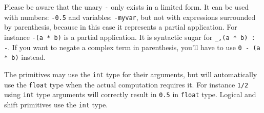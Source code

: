 Please be aware that the unary \lstinline|-| only exists in a limited form. It can be used with numbers: \lstinline|-0.5| and variables: \lstinline|-myvar|, but not with expressions surrounded by parenthesis, because in this case it represents a partial application.  For instance   \lstinline|-(a * b)| is a partial application. It is syntactic sugar for \lstinline|_,(a * b) : -|. If you want to negate a complex term in parenthesis, you'll have to use \lstinline|0 - (a * b)| instead.

The primitives may use the \texttt{int} type for their arguments, but will automatically use the \texttt{float} type when the actual computation requires it. For instance \lstinline|1/2| using \texttt{int} type arguments will correctly result in \lstinline|0.5| in \texttt{float} type. Logical and shift primitives use the \texttt{int} type.

\bigskip


